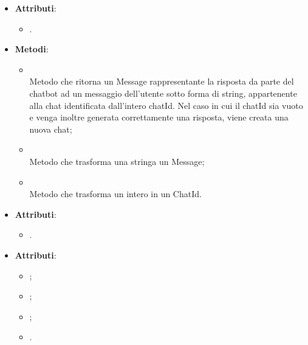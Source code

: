 \documentclass[10pt, a4paper]{article}
\begin{document}
    \label{AskChatbotControllerDettaglio}
    \begin{itemize}
        \item \textbf{Attributi}:
        \begin{itemize}
            \item {}.
        \end{itemize}
        \item \textbf{Metodi}:
        \begin{itemize}
            \item {}\\
            Metodo che ritorna un Message rappresentante la risposta da parte del chatbot ad un messaggio dell'utente sotto forma di string, appartenente alla chat identificata dall'intero chatId. Nel caso in cui il chatId sia vuoto e venga inoltre generata correttamente una risposta, viene creata una nuova chat;
            \item {}\\
            Metodo che trasforma una stringa un Message;
            \item {}\\
            Metodo che trasforma un intero in un ChatId.
        \end{itemize}
    \end{itemize}
    
    \label{ChatIdDettaglio}
    \begin{itemize}
        \item \textbf{Attributi}:
        \begin{itemize}
            \item {}.
        \end{itemize}
    \end{itemize}
    
    \label{MessageDettaglio}
    \begin{itemize}
        \item \textbf{Attributi}:
        \begin{itemize}
            \item {};
            \item {};
            \item {};
            \item {}.
        \end{itemize}
    \end{itemize}
    
\end{document}
